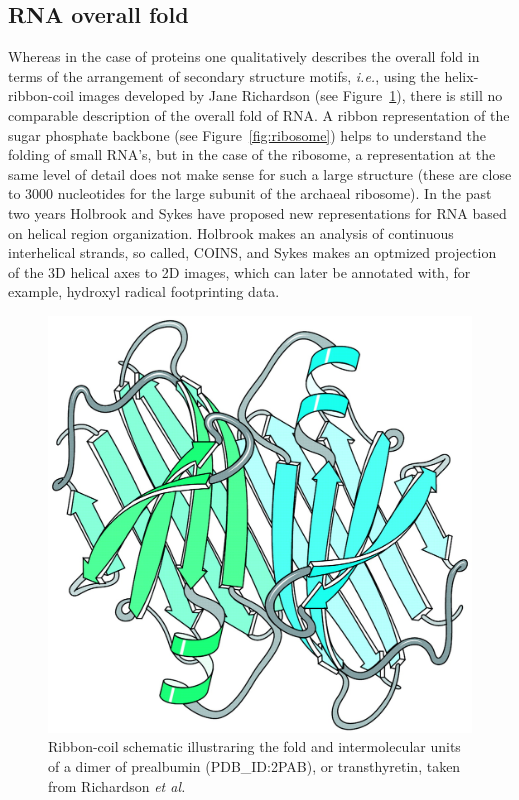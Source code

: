\subsection{RNA  overall fold}
Whereas  in  the case  of  proteins  one  qualitatively describes  the
overall  fold  in terms  of  the  arrangement  of secondary  structure
motifs, \textit{i.e.}, using the helix-ribbon-coil images developed by
Jane           Richardson          \cite{richardson2000}          (see
Figure~\ref{fig:ribboncoil}), there is still no comparable description
of  the overall  fold of  RNA. A  ribbon representation  of  the sugar
phosphate backbone (see Figure~\ref{fig:ribosome}) helps to understand
the  folding of  small  RNA's, but  in  the case  of  the ribosome,  a
representation at  the same  level of detail  does not make  sense for
such a  large structure (these are  close to 3000  nucleotides for the
large  subunit of  the  archaeal  ribosome).  In  the  past two  years
Holbrook \cite{holbrook2008} and  Sykes \cite{sykes2009} have proposed
new  representations for  RNA  based on  helical region  organization.
Holbrook  makes an  analysis  of continuous  interhelical strands,  so
called,  COINS, and  Sykes  makes  an optmized  projection  of the  3D
helical  axes to 2D  images, which  can later  be annotated  with, for
example, hydroxyl radical footprinting data.

\begin{figure}[ht]
\centering
\includegraphics[scale=0.4]{Chapter1/overallfold.png}
\caption{Ribbon-coil    schematic    illustraring    the   fold    and
  intermolecular  units of  a dimer  of prealbumin  (PDB\_ID:2PAB), or
  transthyretin,    taken     from    Richardson    \textit{et    al.}
  \cite{richardson2002}}
\label{fig:ribboncoil}
\end{figure}

